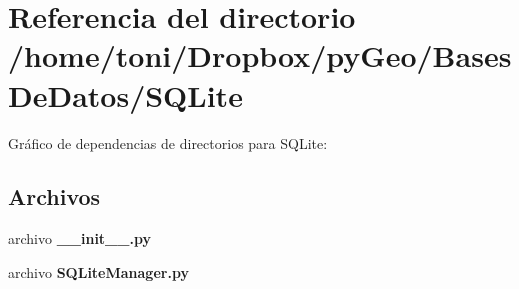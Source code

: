 \section{Referencia del directorio /home/toni/\-Dropbox/py\-Geo/\-Bases\-De\-Datos/\-S\-Q\-Lite}
\label{dir_ca4e8c578842e445289733ff641d09cf}
Gráfico de dependencias de directorios para S\-Q\-Lite\-:
\subsection*{Archivos}
\begin{DoxyCompactItemize}
\item 
archivo {\bf \-\_\-\-\_\-init\-\_\-\-\_\-.\-py}
\item 
archivo {\bf S\-Q\-Lite\-Manager.\-py}
\end{DoxyCompactItemize}
